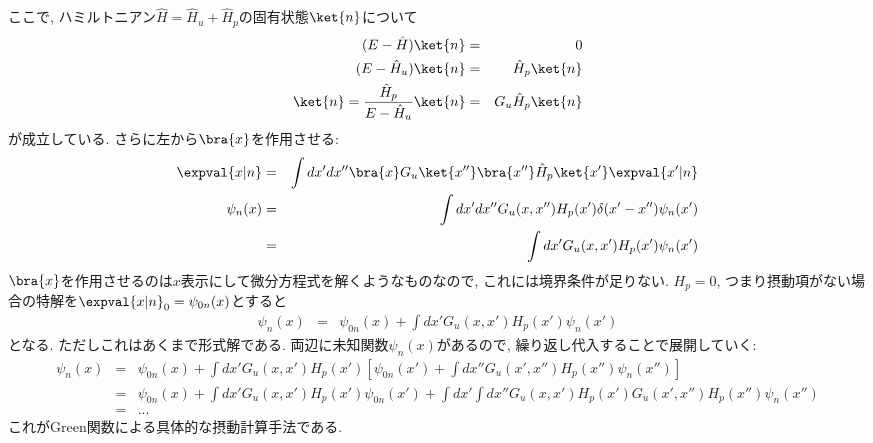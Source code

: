 \documentclass[10.5pt,a4paper]{jreport}
\begin{document}
ここで, ハミルトニアン$\hat{H} = \hat{H}_u+\hat{H}_p$の固有状態$\ket{n}$について
\begin{eqnarray}
  (E-\hat{H})\ket{n} &=& 0\\
  (E-\hat{H}_u)\ket{n} &=& \hat{H}_p\ket{n}\\
  \ket{n} = \frac{\hat{H}_p}{E-\hat{H}_u}\ket{n} &=& G_u\hat{H}_p\ket{n}
\end{eqnarray}
が成立している. さらに左から$\bra{x}$を作用させる:
\begin{eqnarray}
  \expval{x|n} &=& \int dx'dx''\bra{x}G_u\ket{x''}\bra{x''}\hat{H}_p\ket{x'}\expval{x'|n}\\
  \psi_n(x) &=& \int dx'dx''G_u(x, x'')H_p(x')\delta(x'-x'')\psi_n(x')\\
  &=& \int dx'G_u(x, x')H_p(x')\psi_n(x')
\end{eqnarray}
$\bra{x}$を作用させるのは$x$表示にして微分方程式を解くようなものなので, これには境界条件が足りない. $H_p = 0$, つまり摂動項がない場合の特解を$\expval{x|n}_0 = \psi_{0n}(x)$とすると
\begin{eqnarray}
  \psi_n(x) &=& \psi_{0n}(x) + \int dx'G_u(x, x')H_p(x')\psi_n(x')
\end{eqnarray}
となる. ただしこれはあくまで形式解である. 両辺に未知関数$\psi_n(x)$があるので, 繰り返し代入することで展開していく:
\begin{eqnarray}
  \nonumber    \psi_n(x) &=& \psi_{0n}(x) + \int dx'G_u(x, x')H_p(x')\left[\psi_{0n}(x') + \int dx''G_u(x', x'')H_p(x'')\psi_n(x'')\right]\\
  \nonumber     &=& \psi_{0n}(x) + \int dx'G_u(x, x')H_p(x')\psi_{0n}(x') + \int dx'\int dx''G_u(x, x')H_p(x')G_u(x', x'')H_p(x'')\psi_n(x'')\\
  &=&...
\end{eqnarray}
これがGreen関数による具体的な摂動計算手法である. 
\end{document}
